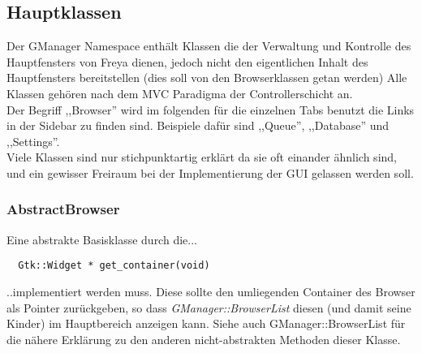 \subsection{Hauptklassen}
Der GManager Namespace enthält Klassen die der Verwaltung und Kontrolle des Hauptfensters von Freya dienen,
jedoch nicht den eigentlichen Inhalt des Hauptfensters bereitstellen (dies soll von den Browserklassen getan werden)
Alle Klassen gehören nach dem MVC Paradigma der Controllerschicht an.
\\
Der Begriff ,,Browser'' wird im folgenden für die einzelnen Tabs benutzt die Links in der Sidebar zu finden sind. 
Beispiele dafür sind ,,Queue'', ,,Database'' und ,,Settings''.
\\
Viele Klassen sind nur stichpunktartig erklärt da sie oft einander ähnlich sind, und ein gewisser Freiraum bei der Implementierung der
GUI gelassen werden soll.


\subsubsection{AbstractBrowser}
Eine abstrakte Basisklasse durch die...
\begin{verbatim}
  Gtk::Widget * get_container(void) 
\end{verbatim}
..implementiert werden muss. Diese sollte den umliegenden Container des Browser als Pointer zurückgeben,
so dass \textit{GManager::BrowserList} diesen (und damit seine Kinder) im Hauptbereich anzeigen kann.
Siehe auch GManager::BrowserList für die nähere Erklärung zu den anderen nicht-abstrakten Methoden dieser Klasse.

